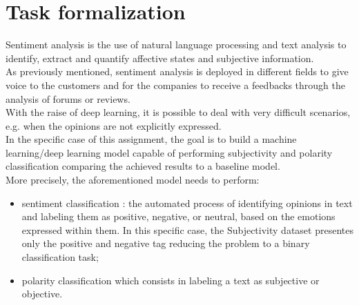 
\section{Task formalization}
Sentiment analysis is the use of natural language processing and text analysis to identify, extract and quantify affective states and subjective information.\\
As previously mentioned, sentiment analysis is deployed in different fields to give voice to the customers and for the companies to receive a feedbacks through the analysis of forums or reviews.\\
With the raise of deep learning, it is possible to deal with very difficult scenarios, e.g. when the opinions are not explicitly expressed.\\
In the specific case of this assignment, the goal is to build a machine learning/deep learning model capable of performing subjectivity and polarity classification comparing the achieved results to a baseline model.\\
More precisely, the aforementioned model needs to perform:
\begin{itemize}
    \item sentiment classification : the automated process of identifying opinions in text and labeling them as positive, negative, or neutral, based on the emotions expressed within them. In this specific case, the Subjectivity dataset presentes only the positive and negative tag reducing the problem to a binary classification task;
    \item polarity classification which consists in labeling a text as subjective or objective.
\end{itemize}


